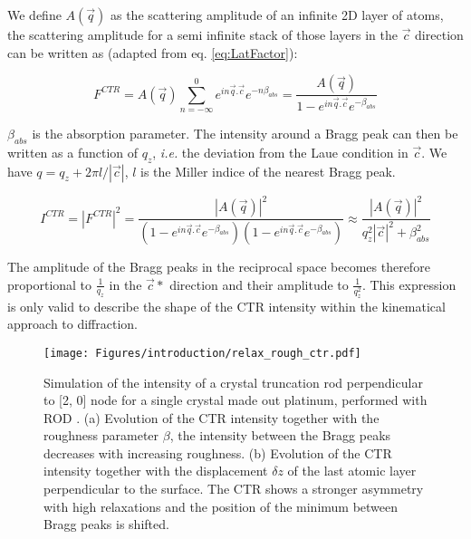 We define $A(\vec{q})$ as the scattering amplitude of an infinite 2D layer of atoms, the scattering amplitude for a semi infinite stack of those layers in the $\vec{c}$ direction can be written as (adapted from eq. \ref{eq:LatFactor}):

\begin{equation}
    \label{eq:CTR1}
    F^{CTR} = A(\vec{q})\sum_{n=-\infty}^0 e^{in\vec{q}.\vec{c}} e^{-n\beta_{abs}} = \frac{A(\vec{q})}{1 - e^{in\vec{q}.\vec{c}} e^{-\beta_{abs}}}
\end{equation}

$\beta_{abs}$ is the absorption parameter.
The intensity around a Bragg peak can then be written as a function of $q_z$, \textit{i.e.} the deviation from the Laue condition in $\vec{c}$. We have $q = q_z + 2\pi l/|\vec{c}|$, $l$ is the Miller indice of the nearest Bragg peak.

\begin{equation}
    \label{eq:CTR2}
    I^{CTR} = |F^{CTR}|^2 = \frac{|A(\vec{q})|^2}{(1 - e^{in\vec{q}.\vec{c}} e^{-\beta_{abs}})(1 - e^{in\vec{q}.\vec{c}} e^{-\beta_{abs}})} \approx \frac{|A(\vec{q})|^2}{q_z^2 |\vec{c}|^2 + \beta_{abs}^2 }
\end{equation}

The amplitude of the Bragg peaks in the reciprocal space becomes therefore proportional to $\frac{1}{q_z}$ in the $\vec{c}*$ direction and their amplitude to $\frac{1}{q_z^2}$.
This expression is only valid to describe the shape of the CTR intensity within the kinematical approach to diffraction.

\begin{figure}[!htb]
    \centering
    \texttt{[image: Figures/introduction/relax\_rough\_ctr.pdf]}
    \caption{
    Simulation of the intensity of a crystal truncation rod perpendicular to [2, 0] node for a single crystal made out platinum, performed with ROD \parencite{Vlieg2000}.
    (a) Evolution of the CTR intensity together with the roughness parameter $\beta$, the intensity between the Bragg peaks decreases with increasing roughness.
    (b) Evolution of the CTR intensity together with the displacement $\delta z$ of the last atomic layer perpendicular to the surface.
    The CTR shows a stronger asymmetry with high relaxations and the position of the minimum between Bragg peaks is shifted.
    }
    \label{fig:CTRSimulation}
\end{figure}

